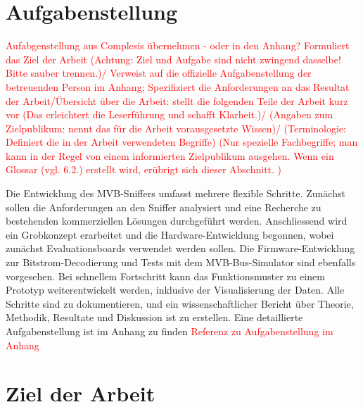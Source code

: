 
\section{Aufgabenstellung}
\label{sec12} %

\textcolor{red}{Aufabgenstellung aus Complesis übernehmen - oder in den Anhang? 
Formuliert das Ziel der Arbeit (Achtung: Ziel und Aufgabe sind nicht zwingend dasselbe! Bitte sauber trennen.)/ Verweist auf die offizielle Aufgabenstellung der betreuenden Person im Anhang; Spezifiziert die Anforderungen an das Resultat der Arbeit/Übersicht über die Arbeit: stellt die folgenden Teile der Arbeit kurz vor (Das erleichtert die Leserführung und schafft Klarheit.)/ (Angaben zum Zielpublikum: nennt das für die Arbeit vorausgesetzte Wissen)/ (Terminologie: Definiert die in  der Arbeit verwendeten Begriffe) (Nur spezielle Fachbegriffe; man kann in der Regel von einem informierten Zielpublikum ausgehen. Wenn ein Glossar (vgl. 6.2.) erstellt wird, erübrigt sich dieser Abschnitt. )}

Die Entwicklung des MVB-Sniffers umfasst mehrere flexible Schritte. Zunächst sollen die Anforderungen an den Sniffer analysiert und eine Recherche zu bestehenden kommerziellen Lösungen durchgeführt werden. Anschliessend wird ein Grobkonzept erarbeitet und die Hardware-Entwicklung begonnen, wobei zunächst Evaluationsboards verwendet werden sollen. Die Firmware-Entwicklung zur Bitstrom-Decodierung und Tests mit dem MVB-Bus-Simulator sind ebenfalls vorgesehen. Bei schnellem Fortschritt kann das Funktionsmuster zu einem Prototyp weiterentwickelt werden, inklusive der Visualisierung der Daten. Alle Schritte sind zu dokumentieren, und ein wissenschaftlicher Bericht über Theorie, Methodik, Resultate und Diskussion ist zu erstellen. Eine detaillierte Aufgabenstellung ist im Anhang zu finden \textcolor{red}{Referenz zu Aufgabenstellung im Anhang}


\section{Ziel der Arbeit}
\label{sec13} %

